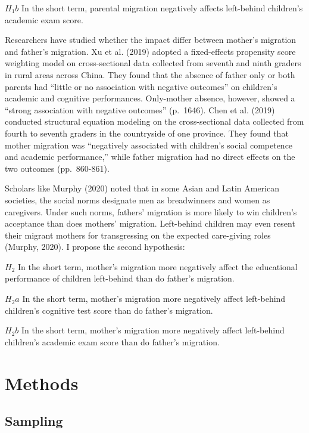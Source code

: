 \documentclass[
  man,floatsintext]{apa7}
\begin{document}
\(H_1b\) In the short term, parental migration negatively affects left-behind children's academic exam score.

Researchers have studied whether the impact differ between mother's migration and father's migration. Xu et al. (2019) adopted a fixed-effects propensity score weighting model on cross-sectional data collected from seventh and ninth graders in rural areas across China. They found that the absence of father only or both parents had ``little or no association with negative outcomes'' on children's academic and cognitive performances. Only-mother absence, however, showed a ``strong association with negative outcomes'' (p.~1646). Chen et al. (2019) conducted structural equation modeling on the cross-sectional data collected from fourth to seventh graders in the countryside of one province. They found that mother migration was ``negatively associated with children's social competence and academic performance,'' while father migration had no direct effects on the two outcomes (pp.~860-861).

Scholars like Murphy (2020) noted that in some Asian and Latin American societies, the social norms designate men as breadwinners and women as caregivers. Under such norms, fathers' migration is more likely to win children's acceptance than does mothers' migration. Left-behind children may even resent their migrant mothers for transgressing on the expected care-giving roles (Murphy, 2020). I propose the second hypothesis:

\(H_2\) In the short term, mother's migration more negatively affect the educational performance of children left-behind than do father's migration.

\(H_2a\) In the short term, mother's migration more negatively affect left-behind children's cognitive test score than do father's migration.

\(H_2b\) In the short term, mother's migration more negatively affect left-behind children's academic exam score than do father's migration.

\newpage

\hypertarget{methods}{%
\section{Methods}\label{methods}}

\hypertarget{sampling}{%
\subsection{Sampling}\label{sampling}}
\end{document}
